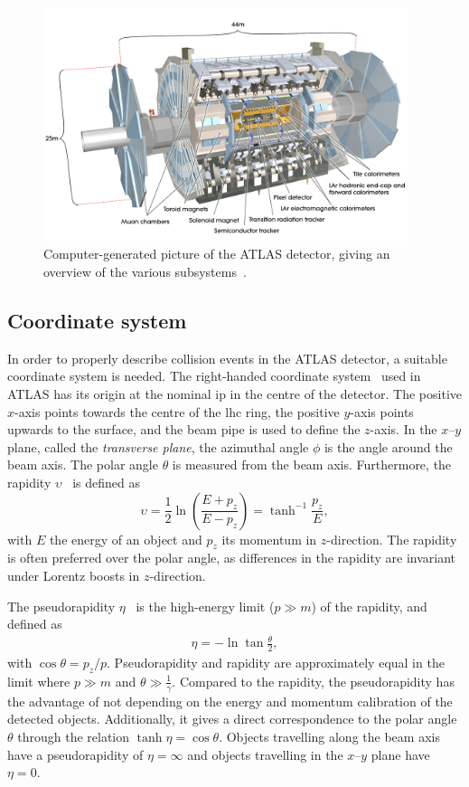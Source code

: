 \begin{figure}
	\centering    
	\includegraphics[width=0.95\textwidth]{atlas}
	\caption[The ATLAS detector]{Computer-generated picture of the ATLAS detector, giving an overview of the various subsystems~\cite{Pequenao:1095924}.}
	\label{fig:atlas_detector}
\end{figure}


\subsection{Coordinate system}

In order to properly describe collision events in the ATLAS detector, a suitable coordinate system is needed. The right-handed coordinate system~\cite{ATLAS:1999uwa} used in ATLAS has its origin at the nominal \gls{ip} in the centre of the detector. The positive $x$-axis points towards the centre of the \gls{lhc} ring, the positive $y$-axis points upwards to the surface, and the beam pipe is used to define the $z$-axis. In the $x$--$y$ plane, called the \textit{transverse plane}, the azimuthal angle $\phi$ is the angle around the beam axis. The polar angle $\theta$ is measured from the beam axis. Furthermore, the rapidity $\upsilon$~\cite{pdg2020} is defined as
\begin{equation}
	\upsilon = \frac{1}{2}\ln\left(\frac{E+p_z}{E-p_z}\right) = \tanh^{-1}{\frac{p_z}{E}},
\end{equation}
with $E$ the energy of an object and $p_z$ its momentum in $z$-direction. The rapidity is often preferred over the polar angle, as differences in the rapidity are invariant under Lorentz boosts in $z$-direction.

The pseudorapidity $\eta$~\cite{pdg2020} is the high-energy limit ($p\gg m$) of the rapidity, and defined as
\begin{align}
	\eta = - \ln\tan\frac{\theta}{2},
\end{align}
with $\cos\theta = p_z/p$. Pseudorapidity and rapidity are approximately equal in the limit where $p\gg m$ and $\theta \gg \frac{1}{\gamma}$. Compared to the rapidity, the pseudorapidity has the advantage of not depending on the energy and momentum calibration of the detected objects. Additionally, it gives a direct correspondence to the polar angle $\theta$ through the relation $\tanh\eta = \cos\theta$. Objects travelling along the beam axis have a pseudorapidity of $\eta = \infty$ and objects travelling in the $x$--$y$ plane have $\eta = 0$.


